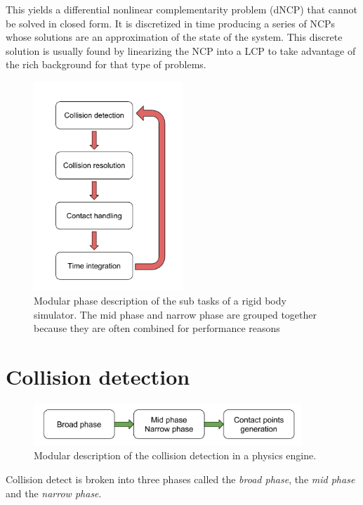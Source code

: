 This yields a differential nonlinear complementarity problem (dNCP) that cannot be solved in closed form. It is discretized in time producing a series of NCPs whose solutions are an approximation of the state of the system.  This discrete solution is usually found by linearizing the NCP into a LCP to take advantage of the rich background for that type of problems.

\begin{figure}[htp]
\center
\includegraphics[width=0.5\textwidth]{figures/star_simul_loop2}
\caption[Modular phase description of the sub tasks of a rigid body simulator]{Modular phase description of the sub tasks of a rigid body simulator. The mid phase and narrow phase are grouped together because they are often combined for performance reasons}
\label{fig:phase_simul}
\end{figure}

\section{Collision detection}
\begin{figure}
\center
\includegraphics[width=0.9\textwidth]{figures/STAR_collision_v2}
\caption[Collision detection]{Modular description of the collision detection in a physics engine.}
\label{fig:star_collision}
\end{figure}

Collision detect is broken into three phases called the \emph{broad phase}, the \emph{mid phase} and the \emph{narrow phase}. 


